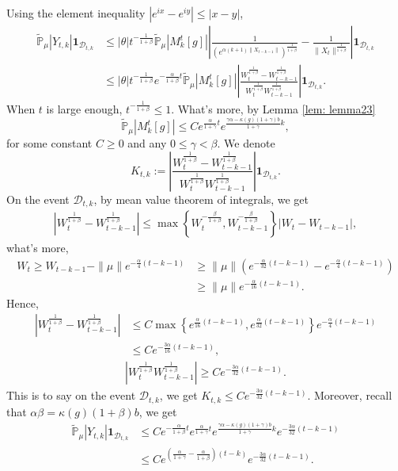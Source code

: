 \documentclass[12pt, a4paper]{amsart}
\theoremstyle{definition}
\numberwithin{equation}{section}
\begin{document}
    Using the element inequality $|e^{ix}-e^{iy}|\leq|x-y|$,
    \begin{align*}
        \mathbb{\tilde{P}}_{\mu}|Y_{t,k}|\mathbf{1}_{\mathcal{D}_{t,k}}&\leq|\theta|t^{-\frac{1}{1+\beta}}\mathbb{\tilde{P}}_{\mu}|M_k^t[g]|\left|\frac{1}{\left(e^{\alpha(k+1)\|X_{t-k-1}\|}\right)^{\frac{1}{1+\beta}}}-\frac{1}{\|X_t\|^{\frac{1}{1+\beta}}}\right|\mathbf{1}_{\mathcal{D}_{t,k}}\\
        &\leq|\theta|t^{-\frac{1}{1+\beta}}e^{-\frac{\alpha}{1+\beta}t}\mathbb{\tilde{P}}_{\mu}|M_k^t[g]|\left|\frac{W_t^{\frac{1}{1+\beta}}-W_{t-k-1}^{\frac{1}{1+\beta}}}{W_t^{\frac{1}{1+\beta}}W_{t-k-1}^{\frac{1}{1+\beta}}}\right|\mathbf{1}_{\mathcal{D}_{t,k}}.
    \end{align*}
    When $t$ is large enough, $t^{-\frac{1}{1+\beta}}\leq 1$. What's more, by Lemma \ref{lem: lemma23}
    $$\mathbb{\tilde{P}}_{\mu}|M_k^t[g]|\leq C e^{\frac{\alpha}{1+\gamma}t}e^{\frac{\gamma \alpha-\kappa(g)(1+\gamma)b}{1+\gamma}k},$$
for some constant $C \geq 0$ and any $0\leq\gamma<\beta$.
We denote
$$K_{t,k}:=\left|\frac{W_t^{\frac{1}{1+\beta}}-W_{t-k-1}^{\frac{1}{1+\beta}}}{W_t^{\frac{1}{1+\beta}}W_{t-k-1}^{\frac{1}{1+\beta}}}\right|\mathbf{1}_{\mathcal{D}_{t,k}}.$$
 On the event $\mathcal{D}_{t,k}$, by mean value theorem of integrals, we get
 \begin{align*}
     \left|W_t^{\frac{1}{1+\beta}}-W_{t-k-1}^{\frac{1}{1+\beta}}\right|\leq \max \left\{W_t^{-\frac{\beta}{1+\beta}},W_{t-k-1}^{-\frac{\beta}{1+\beta}}\right\}\left|W_t-W_{t-k-1}\right|,
 \end{align*}
 what's more,
 \begin{align*}
     W_t\geq W_{t-k-1}-\|\mu\| e^{-\frac{\alpha}{4}(t-k-1)}&\geq\|\mu\|\left(e^{-\frac{\alpha}{32}(t-k-1)}-e^{-\frac{\alpha}{4}(t-k-1)}\right)\\
     &\geq \|\mu\| e^{-\frac{\alpha}{16}(t-k-1)}.
 \end{align*}
Hence,
\begin{align*}
    \left|W_t^{\frac{1}{1+\beta}}-W_{t-k-1}^{\frac{1}{1+\beta}}\right|&\leq C \max\left\{e^{\frac{\alpha}{16}(t-k-1)}, e^{\frac{\alpha}{32}(t-k-1)}\right\}e^{-\frac{\alpha}{4}(t-k-1)}\\
    &\leq C e^{-\frac{3\alpha}{16}(t-k-1)},
\end{align*}
\begin{align*}
    \left|W_t^{\frac{1}{1+\beta}}W_{t-k-1}^{\frac{1}{1+\beta}}\right|\geq C e^{-\frac{3\alpha}{32}(t-k-1)}.
\end{align*}
This is to say on the event $\mathcal{D}_{t,k}$, we get $K_{t,k}\leq C e^{-\frac{3\alpha}{32}(t-k-1)}$. Moreover, recall that $\alpha\beta=\kappa(g)(1+\beta)b$, we get
\begin{align}
    \mathbb{\tilde{P}}_{\mu}|Y_{t,k}|\mathbf{1}_{\mathcal{D}_{t,k}}&\leq C e^{-\frac{\alpha}{1+\beta}t}e^{\frac{\alpha}{1+\gamma}t}e^{\frac{\gamma \alpha-\kappa(g)(1+\gamma)b}{1+\gamma}k}e^{-\frac{3\alpha}{32}(t-k-1)}\label{thm125}\\
    &\leq C e^{(\frac{\alpha}{1+\gamma}-\frac{\alpha}{1+\beta})(t-k)}e^{-\frac{3\alpha}{32}(t-k-1)}.\nonumber
\end{align}
\end{document}
